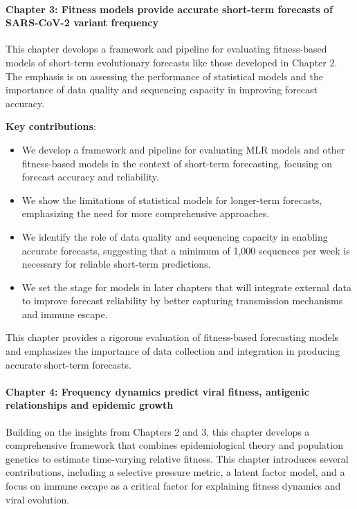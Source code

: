 \paragraph{Chapter 3: Fitness models provide accurate short-term forecasts of SARS-CoV-2 variant frequency}

This chapter develops a framework and pipeline for evaluating fitness-based models of short-term evolutionary forecasts like those developed in Chapter 2.
The emphasis is on assessing the performance of statistical models and the importance of data quality and sequencing capacity in improving forecast accuracy.

\noindent\textbf{Key contributions}:
\begin{itemize}
        \item We develop a framework and pipeline for evaluating MLR models and other fitness-based models in the context of short-term forecasting, focusing on forecast accuracy and reliability.
        \item We show the limitations of statistical models for longer-term forecasts, emphasizing the need for more comprehensive approaches.
        \item We identify the role of data quality and sequencing capacity in enabling accurate forecasts, suggesting that a minimum of 1,000 sequences per week is necessary for reliable short-term predictions.
        \item We set the stage for models in later chapters that will integrate external data to improve forecast reliability by better capturing transmission mechanisms and immune escape.
\end{itemize}

This chapter provides a rigorous evaluation of fitness-based forecasting models and emphasizes the importance of data collection and integration in producing accurate short-term forecasts.

\paragraph{Chapter 4: Frequency dynamics predict viral fitness, antigenic relationships and epidemic growth}

Building on the insights from Chapters 2 and 3, this chapter develops a comprehensive framework that combines epidemiological theory and population genetics to estimate time-varying relative fitness.
This chapter introduces several contributions, including a selective pressure metric, a latent factor model, and a focus on immune escape as a critical factor for explaining fitness dynamics and viral evolution.

